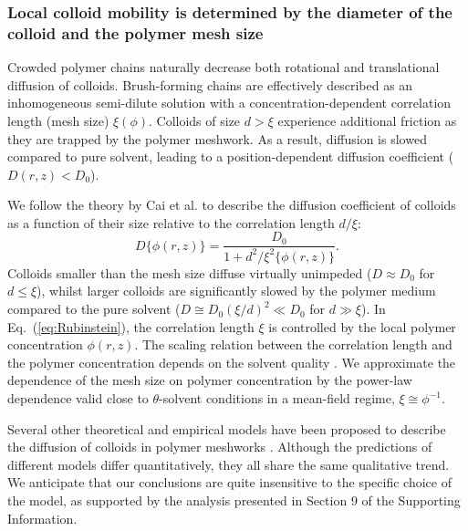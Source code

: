 \documentclass[12pt, a4paper]{article}
\begin{document}
\subsubsection{Local colloid mobility is determined by the diameter of the colloid and the polymer mesh size}

Crowded polymer chains naturally decrease both rotational \cite{Fu2017} and translational \cite{Stewart1998} diffusion of colloids.
Brush-forming chains are effectively described as an inhomogeneous semi-dilute solution with a concentration-dependent correlation length (mesh size) $\xi(\phi)$.
Colloids of size $d > \xi$ experience additional friction as they are trapped by the polymer meshwork.
As a result, diffusion is slowed compared to pure solvent, leading to a position-dependent diffusion coefficient ($D(r,z) < D_0$).

We follow the theory by Cai et al. \cite{Cai2011} to describe the diffusion coefficient of colloids as a function of their size relative to the correlation length $d / \xi$:
\begin{equation}
    D\{\phi(r,z)\} = \frac{D_0}{1+d^2/\xi^{2}\{\phi(r,z)\}}.
    \label{eq:Rubinstein}
\end{equation}
Colloids smaller than the mesh size diffuse virtually unimpeded ($D \approx D_0$ for $d\leq \xi$), whilst larger colloids are significantly slowed by the polymer medium compared to the pure solvent ($D\cong D_0 (\xi/d)^2\ll D_0$ for $d\gg \xi$).
In Eq.~(\ref{eq:Rubinstein}), the correlation length $\xi$ is controlled by the local polymer concentration $\phi(r,z)$.
The scaling relation between the correlation length and the polymer concentration depends on the solvent quality \cite{DeGennes1979}.
We approximate the dependence of the mesh size on polymer concentration by the power-law dependence valid close to $\theta$-solvent conditions in a mean-field regime, $\xi\cong \phi^{-1}$.

Several other theoretical and empirical models have been proposed to describe the diffusion of colloids in polymer meshworks \cite{Kohli2012,Holyst2009,Phillies1988}.
Although the predictions of different models differ quantitatively, they all share the same qualitative trend. We anticipate that our conclusions are quite insensitive to the specific choice of the model, as supported by the analysis presented in Section 9 of the Supporting Information.

\end{document}
